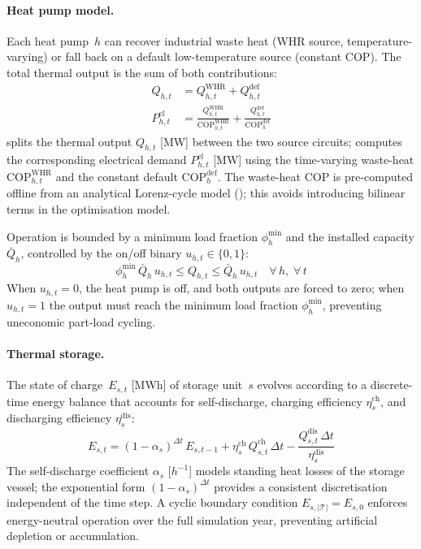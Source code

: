 \documentclass[a4paper,fleqn]{cas-dc}
\begin{document}
\paragraph{Heat pump model.}
Each heat pump~$h$ can recover industrial waste heat (WHR source,
temperature-varying) or fall back on a default low-temperature
source (constant COP). The total thermal output is the sum of both
contributions:
%
\begin{align}
  Q_{h,t} &= Q_{h,t}^{\mathrm{WHR}} + Q_{h,t}^{\mathrm{def}}
  \label{eq:hp_split} \\[4pt]
  P_{h,t}^{\mathrm{el}} &= \frac{Q_{h,t}^{\mathrm{WHR}}}{
    \mathrm{COP}_{h,t}^{\mathrm{WHR}}}
    + \frac{Q_{h,t}^{\mathrm{def}}}{\mathrm{COP}_h^{\mathrm{def}}}
  \label{eq:hp_pel}
\end{align}
%
 splits the thermal output $Q_{h,t}$ [MW]
between the two source circuits;  computes the
corresponding electrical demand $P_{h,t}^{\mathrm{el}}$ [MW] using
the time-varying waste-heat $\mathrm{COP}_{h,t}^{\mathrm{WHR}}$
and the constant default $\mathrm{COP}_h^{\mathrm{def}}$.
The waste-heat COP is pre-computed offline from an analytical
Lorenz-cycle model (); this avoids introducing
bilinear terms in the optimisation  model.

Operation is bounded by a minimum load fraction
$\phi_h^{\mathrm{min}}$ and the installed capacity $\bar{Q}_h$,
controlled by the on/off binary $u_{h,t} \in \{0,1\}$:
%
\begin{equation}
  \phi_h^{\mathrm{min}}\, \bar{Q}_h\, u_{h,t}
  \leq Q_{h,t} \leq \bar{Q}_h\, u_{h,t}
  \quad \forall\, h,\; \forall\, t
  \label{eq:hp_cap}
\end{equation}
%
When $u_{h,t} = 0$, the heat pump is off, and both outputs are
forced to zero; when $u_{h,t} = 1$ the output must reach the
minimum load fraction $\phi_h^{\mathrm{min}}$, preventing
uneconomic part-load cycling.

\paragraph{Thermal storage.}
The state of charge~$E_{s,t}$ [MWh] of storage unit~$s$ evolves
according to a discrete-time energy balance that accounts for
self-discharge, charging efficiency $\eta_s^{\mathrm{ch}}$, and
discharging efficiency $\eta_s^{\mathrm{dis}}$:
%
\begin{equation}
  E_{s,t} = (1 - \alpha_s)^{\Delta t}\, E_{s,t-1}
    + \eta_s^{\mathrm{ch}}\, Q_{s,t}^{\mathrm{ch}}\, \Delta t
    - \frac{Q_{s,t}^{\mathrm{dis}}\, \Delta t}{\eta_s^{\mathrm{dis}}}
  \label{eq:storage_soc}
\end{equation}
%
The self-discharge coefficient $\alpha_s$
[$h^{-1}$] models standing heat losses of the storage vessel;
the exponential form $(1-\alpha_s)^{\Delta t}$ provides a
consistent discretisation independent of the time step. A cyclic
boundary condition $E_{s,|\mathcal{T}|} = E_{s,0}$ enforces
energy-neutral operation over the full simulation year, preventing
artificial depletion or accumulation.
\end{document}
